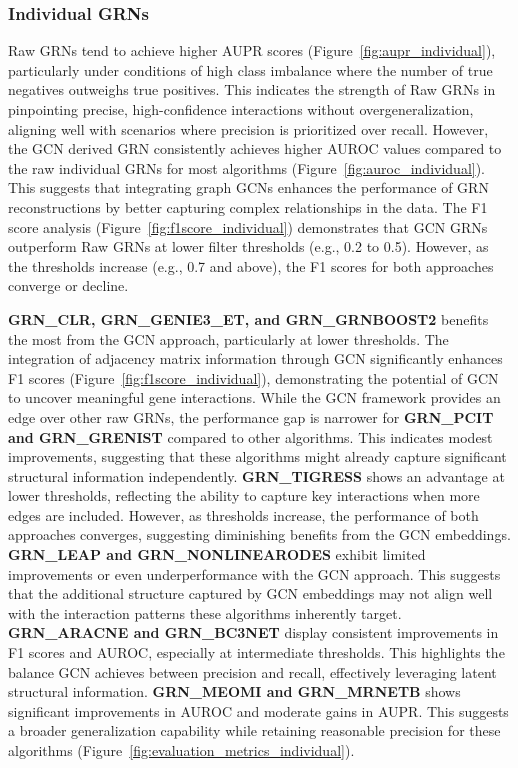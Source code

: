 \documentclass{article}
\begin{document}
\subsubsection*{Individual GRNs}
Raw GRNs tend to achieve higher AUPR scores (Figure~\ref{fig:aupr_individual}), particularly under conditions of high class imbalance where the number of true negatives outweighs true positives. This indicates the strength of Raw GRNs in pinpointing precise, high-confidence interactions without overgeneralization, aligning well with scenarios where precision is prioritized over recall. However, the GCN derived GRN consistently achieves higher AUROC values compared to the raw individual GRNs for most algorithms (Figure~\ref{fig:auroc_individual}). This suggests that integrating graph GCNs enhances the performance of GRN reconstructions by better capturing complex relationships in the data. The F1 score analysis (Figure~\ref{fig:f1score_individual}) demonstrates that GCN GRNs outperform Raw GRNs at lower filter thresholds (e.g., 0.2 to 0.5). However, as the thresholds increase (e.g., 0.7 and above), the F1 scores for both approaches converge or decline.

\textbf{GRN\_CLR, GRN\_GENIE3\_ET, and GRN\_GRNBOOST2} benefits the most from the GCN approach, particularly at lower thresholds. The integration of adjacency matrix information through GCN significantly enhances F1 scores (Figure~\ref{fig:f1score_individual}), demonstrating the potential of GCN to uncover meaningful gene interactions. While the GCN framework provides an edge over other raw GRNs, the performance gap is narrower for \textbf{GRN\_PCIT and GRN\_GRENIST} compared to other algorithms. This indicates modest improvements, suggesting that these algorithms might already capture significant structural information independently. \textbf{GRN\_TIGRESS} shows an advantage at lower thresholds, reflecting the ability to capture key interactions when more edges are included. However, as thresholds increase, the performance of both approaches converges, suggesting diminishing benefits from the GCN embeddings. \textbf{GRN\_LEAP and GRN\_NONLINEARODES} exhibit limited improvements or even  underperformance with the GCN approach. This suggests that the additional structure captured by GCN embeddings may not align well with the interaction patterns these algorithms inherently target. \textbf{GRN\_ARACNE and GRN\_BC3NET} display consistent improvements in F1 scores and AUROC, especially at intermediate thresholds. This highlights the balance GCN achieves between precision and recall, effectively leveraging latent structural information. \textbf{GRN\_MEOMI and GRN\_MRNETB} shows significant improvements in AUROC and moderate gains in AUPR. This suggests a broader generalization capability while retaining reasonable precision for these algorithms (Figure~\ref{fig:evaluation_metrics_individual}).
\end{document}
